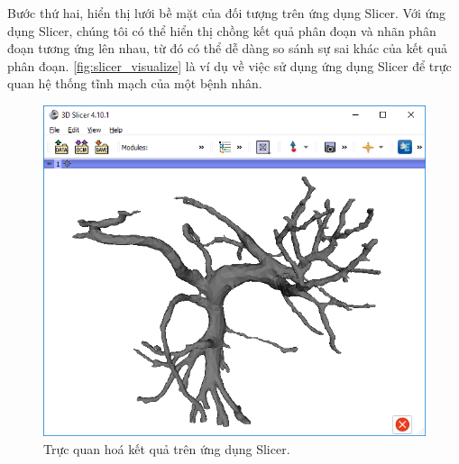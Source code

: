 	Bước thứ hai, hiển thị lưới bề mặt của đối tượng trên ứng dụng Slicer. Với ứng dụng Slicer, chúng tôi có thể hiển thị chồng kết quả phân đoạn và nhãn phân đoạn tương ứng lên nhau, từ đó có thể dễ dàng so sánh sự sai khác của kết quả phân đoạn. \autoref{fig:slicer_visualize} là ví dụ về việc sử dụng ứng dụng Slicer để trực quan hệ thống tĩnh mạch của một bệnh nhân.
	\vspace{2mm}
	\begin{figure}[h!]
		\includegraphics[width=\textwidth]{figures/slicer_visualize}
		\caption{Trực quan hoá kết quả trên ứng dụng Slicer.}
		\label{fig:slicer_visualize}
	\end{figure}